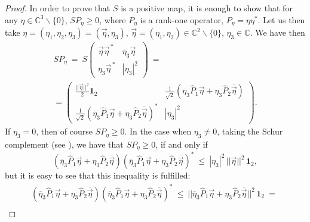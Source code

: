 \documentclass[12pt]{article}
\theoremstyle{plain}
\theoremstyle{definition}
\theoremstyle{remark}
\numberwithin{equation}{section}
\begin{document}
\begin{proof}
In order to prove that $S$ is a positive map,
it is enough to show that for any $\eta \in \mathbb{C}^{3}\backslash\{0\}$, 
$SP_{\eta} \geq 0$,
where $P_{\eta}$ is a rank-one operator,
$P_{\eta} = \eta \eta^{*}$.
Let us then take
$\eta = (\eta_{1}, \eta_{2}, \eta_{3}) = (\vec{\eta}, \eta_{3})$,
$\vec{\eta} = (\eta_{1}, \eta_{2}) \in \mathbb{C}^{2}\backslash\{0\}$,
$\eta_{3} \in \mathbb{C}$.
We have then
\begin{multline}
 SP_{\eta} \:=\:  S \begin{pmatrix}
    \vec{\eta} \vec{\eta}^{\,*} & \overline{\eta}_{3} \vec{\eta} \\
    \eta_{3} \vec{\eta}^{\,*}   & |\eta_{3}|^{2}
 \end{pmatrix} \: = \: \\
 = \begin{pmatrix}
  \frac{||\vec{\eta}||^{2}}{2} \mathbf{1}_{2} &
        \frac{1}{\sqrt{2}} \left ( \overline{\eta}_{3} \hat{P}_{1} \vec{\eta} +
          \eta_{3} \hat{P}_{2} \overline{\vec{\eta}} \right) \\
\frac{1}{\sqrt{2}} \left ( \overline{\eta}_{3} \hat{P}_{1} \vec{\eta} +
          \eta_{3} \hat{P}_{2} \overline{\vec{\eta}} \right)^{*} &
        |\eta_{3}|^{2}
 \end{pmatrix}.
\end{multline}
If $\eta_{3} = 0$, then of course $SP_{\eta} \geq 0$.
In the case when $\eta_{3} \neq 0$,
taking the Schur complement
(see \cite[Theorem 1.12, p.34]{zhang2006schur}),
we have that $SP_{\eta} \geq 0$, if and only if
\begin{equation}
\label{ieq:SchurForS}
   \left ( \overline{\eta}_{3} \hat{P}_{1} \vec{\eta} +
    \eta_{3} \hat{P}_{2} \overline{\vec{\eta}} \right)
   \left ( \overline{\eta}_{3} \hat{P}_{1} \vec{\eta} +
    \eta_{3} \hat{P}_{2} \overline{\vec{\eta}} \right)^{*} 
    \: \leq \:
        |\eta_{3}|^{2} \, ||\vec{\eta}||^{2} \, \mathbf{1}_{2},
\end{equation}
but it is easy to see that this inequality is fulfilled:
\begin{multline}
   \left ( \overline{\eta}_{3} \hat{P}_{1} \vec{\eta} +
    \eta_{3} \hat{P}_{2} \overline{\vec{\eta}} \right)
   \left ( \overline{\eta}_{3} \hat{P}_{1} \vec{\eta} +
    \eta_{3} \hat{P}_{2} \overline{\vec{\eta}} \right)^{*} \: \leq \:
|| \overline{\eta}_{3} \hat{P}_{1} \vec{\eta} +
    \eta_{3} \hat{P}_{2}\overline{\vec{\eta}} ||^{2} \, \mathbf{1}_{2}
    \: = \: \\

\end{multline}
\end{proof}
\end{document}
